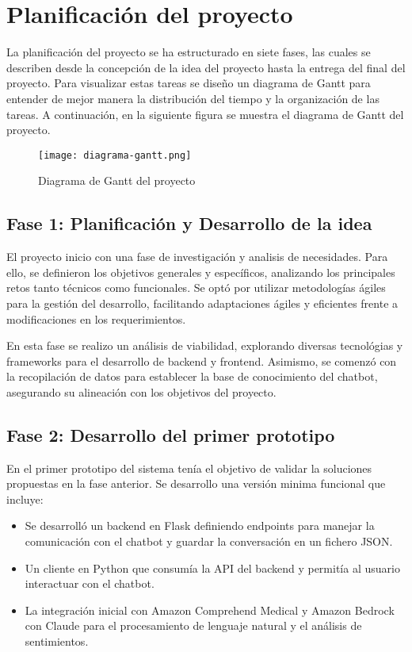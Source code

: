 
\section{Planificación del proyecto}
La planificación del proyecto se ha estructurado en siete fases, las cuales se describen desde la concepción de la idea del proyecto hasta la entrega del final del proyecto. Para visualizar estas tareas se diseño un diagrama de Gantt para entender de mejor manera la distribución del tiempo y la organización de las tareas. A continuación, en la siguiente figura se muestra el diagrama de Gantt del proyecto. 
\begin{figure}[H]
    \centering
    \texttt{[image: diagrama-gantt.png]}  %
    \caption{Diagrama de Gantt del proyecto}
    \label{fig:gantt}
\end{figure}

\subsection{Fase 1: Planificación y Desarrollo de la idea}
El proyecto inicio con una fase de investigación y analisis de necesidades. Para ello, se definieron los objetivos generales y específicos, analizando los principales retos tanto técnicos como funcionales. Se optó por utilizar metodologías ágiles para la gestión del desarrollo, facilitando adaptaciones ágiles y eficientes frente a modificaciones en los requerimientos.

En esta fase se realizo un análisis de viabilidad, explorando diversas tecnológias y frameworks para el desarrollo de backend y frontend. Asimismo, se comenzó con la recopilación de datos para establecer la base de conocimiento del chatbot, asegurando su alineación con los objetivos del proyecto.
\subsection{Fase 2: Desarrollo del primer prototipo}
En el primer prototipo del sistema tenía el objetivo de validar la soluciones propuestas en la fase anterior. Se desarrollo una versión minima funcional que incluye:

\begin{itemize}
    \item Se desarrolló un backend en Flask definiendo endpoints para manejar la comunicación con el chatbot y guardar la conversación en un fichero JSON.
    \item Un cliente en Python que consumía la API del backend y permitía al usuario interactuar con el chatbot.
    \item La integración inicial con Amazon Comprehend Medical y Amazon Bedrock con Claude para el procesamiento de lenguaje natural y el análisis de sentimientos.
\end{itemize}


    